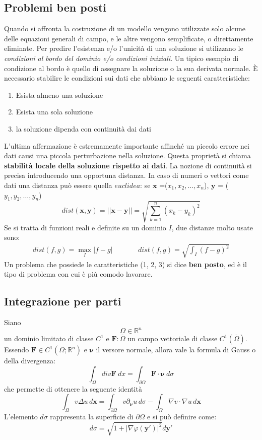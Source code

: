 \documentclass[a4paper,12pt, draft]{article}
\theoremstyle{break}
\let\phi\varphi
\numberwithin{equation}{section}
\begin{document}
\subsection{Problemi ben posti}
Quando si affronta la costruzione di un modello vengono utilizzate solo alcune delle equazioni generali di campo, e le altre vengono semplificate, o direttamente eliminate. Per predire l'esistenza e/o l'unicità di una soluzione si utilizzano le \textit{condizioni al bordo del dominio e/o condizioni iniziali}. Un tipico esempio di condizione al bordo è quello di assegnare la soluzione o la sua derivata normale. 
È necessario stabilire le condizioni sui dati che abbiano le seguenti caratteristiche:
\begin{enumerate}
\item Esista almeno una soluzione
\item Esista una sola soluzione
\item la soluzione dipenda con continuità dai dati
\end{enumerate}
L'ultima affermazione è estremamente importante affinché un piccolo errore nei dati causi una piccola perturbazione nella soluzione. Questa proprietà si chiama \textbf{stabilità locale della soluzione rispetto ai dati}.
La nozione di continuità si precisa introducendo una opportuna distanza. In caso di numeri o vettori come dati una distanza può essere quella $euclidea$: se $\bm{x}$ =($x_1, x_2, \ldots, x_n$), $\bm{y}$ = ($y_1, y_2, \ldots, y_n$)
$$dist(\bm{x}, \bm{y}) =  ||\bm{x}-\bm{y}|| = \sqrt{\sum_{k=1}^n(x_k-y_k)^2}$$
Se si tratta di funzioni reali e definite su un dominio $I$, due distanze molto usate sono:
$$
\begin{array}{lcr}
dist(f,g) = \underset{I}{\max}|f-g| &\quad \quad & dist(f,g) = \sqrt{\int_I (f-g)^2}
\end{array}
$$
Un problema che possiede le caratteristiche (1, 2, 3) si dice \textbf{ben posto}, ed è il tipo di problema con cui è più comodo lavorare.
\subsection{Integrazione per parti}
Siano $$\Omega \in \mathbb{R}^n$$ un dominio limitato di classe $C^1$ e $\textbf{F}: \overline{\Omega}$ un campo vettoriale di classe $C^1(\overline{\Omega})$. Essendo $\textbf{F} \in C^1(\overline{\Omega}; \mathbb{R}^n)$ e $\boldsymbol{\nu}$ il versore normale, allora vale la formula di Gauss o della divergenza:
\begin{equation} 
\int_{\Omega} div\textbf{F} \ dx = \int_{\partial\Omega} \textbf{F} \cdot \boldsymbol{\nu} \ d\sigma \label{Integrazione per parti}
\end{equation}
che permette di ottenere la seguente identità
\begin{equation}
  \int_{\Omega} v\Delta u \, d\bm{x} = \int_{\partial\Omega} v\partial_{\bm\nu} u \, d\sigma - \int_{\Omega} \nabla v \cdot \nabla u \, d\bm{x} \label{Identità di Green}
\end{equation}
L'elemento $d\sigma$ rappresenta la superficie di $\partial\Omega$ e si può definire come:
$$d\sigma = \sqrt{1+|\nabla \phi(\bm{y}')|^2}d\bm{y}'$$
\end{document}

